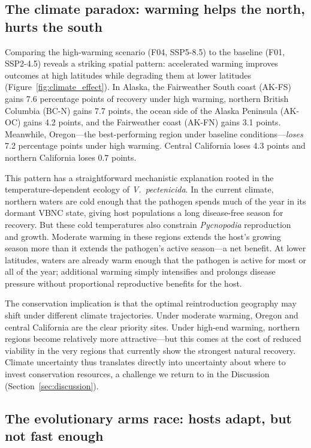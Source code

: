 \subsection{The climate paradox: warming helps the north, hurts the south}
\label{sec:findings_climate}

Comparing the high-warming scenario (F04, SSP5-8.5) to the baseline (F01,
SSP2-4.5) reveals a striking spatial pattern: accelerated warming improves
outcomes at high latitudes while degrading them at lower latitudes
(Figure~\ref{fig:climate_effect}). In Alaska, the Fairweather South coast
(AK-FS) gains 7.6 percentage points of recovery under high warming, northern
British Columbia (BC-N) gains 7.7 points, the ocean side of the Alaska Peninsula
(AK-OC) gains 4.2 points, and the Fairweather coast (AK-FN) gains 3.1 points.
Meanwhile, Oregon---the best-performing region under baseline conditions---\textit{loses}
7.2 percentage points under high warming. Central California loses 4.3 points and
northern California loses 0.7 points.

This pattern has a straightforward mechanistic explanation rooted in the
temperature-dependent ecology of \textit{V.\ pectenicida}. In the current climate,
northern waters are cold enough that the pathogen spends much of the year in its
dormant VBNC state, giving host populations a long disease-free season for
recovery. But these cold temperatures also constrain \textit{Pycnopodia} reproduction
and growth. Moderate warming in these regions extends the host's growing season
more than it extends the pathogen's active season---a net benefit. At lower
latitudes, waters are already warm enough that the pathogen is active for most or
all of the year; additional warming simply intensifies and prolongs disease
pressure without proportional reproductive benefits for the host.

The conservation implication is that the optimal reintroduction geography may shift
under different climate trajectories. Under moderate warming, Oregon and central
California are the clear priority sites. Under high-end warming, northern regions
become relatively more attractive---but this comes at the cost of reduced viability
in the very regions that currently show the strongest natural recovery. Climate
uncertainty thus translates directly into uncertainty about where to invest
conservation resources, a challenge we return to in the Discussion
(Section~\ref{sec:discussion}).

\subsection{The evolutionary arms race: hosts adapt, but not fast enough}
\label{sec:findings_arms_race}

